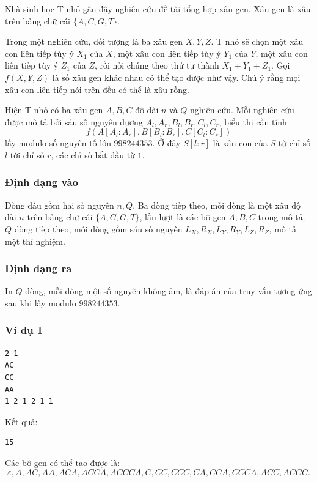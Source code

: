 \documentclass[11pt]{article}
\begin{document}
Nhà sinh học T nhỏ gần đây nghiên cứu đề tài tổng hợp xâu gen. Xâu gen là xâu
trên bảng chữ cái \(\{A,C,G,T\}\).

Trong một nghiên cứu, đối tượng là ba xâu gen \(X,Y,Z\). T nhỏ sẽ chọn một xâu
con liên tiếp tùy ý \(X_1\) của \(X\), một xâu con liên tiếp tùy ý \(Y_1\) của
\(Y\), một xâu con liên tiếp tùy ý \(Z_1\) của \(Z\), rồi nối chúng theo thứ tự
thành \(X_1+Y_1+Z_1\). Gọi \(f(X,Y,Z)\) là số xâu gen khác nhau có thể tạo
được như vậy. Chú ý rằng mọi xâu con liên tiếp nói trên đều có thể là xâu
rỗng.

Hiện T nhỏ có ba xâu gen \(A,B,C\) độ dài \(n\) và \(Q\) nghiên cứu. Mỗi
nghiên cứu được mô tả bởi sáu số nguyên dương
\(A_l,A_r,B_l,B_r,C_l,C_r\), biểu thị cần tính
\[
  f(A[A_l:A_r],B[B_l:B_r],C[C_l:C_r])
\]
lấy modulo số nguyên tố lớn \(998244353\). Ở đây \(S[l:r]\) là xâu con của
\(S\) từ chỉ số \(l\) tới chỉ số \(r\), các chỉ số bắt đầu từ \(1\).

\subsubsection{Định dạng vào}

Dòng đầu gồm hai số nguyên \(n,Q\). Ba dòng tiếp theo, mỗi dòng là một xâu độ
dài \(n\) trên bảng chữ cái \(\{A,C,G,T\}\), lần lượt là các bộ gen
\(A,B,C\) trong mô tả. \(Q\) dòng tiếp theo, mỗi dòng gồm sáu số nguyên
\(L_X,R_X,L_Y,R_Y,L_Z,R_Z\), mô tả một thí nghiệm.

\subsubsection{Định dạng ra}

In \(Q\) dòng, mỗi dòng một số nguyên không âm, là đáp án của truy vấn tương
ứng sau khi lấy modulo \(998244353\).

\subsubsection{Ví dụ 1}

\begin{verbatim}
2 1
AC
CC
AA
1 2 1 2 1 1
\end{verbatim}

Kết quả:
\begin{verbatim}
15
\end{verbatim}

Các bộ gen có thể tạo được là:
\[
\varepsilon,A,AC,AA,ACA,ACCA,ACCCA,C,CC,CCC,CA,CCA,CCCA,ACC,ACCC.
\]
\end{document}
